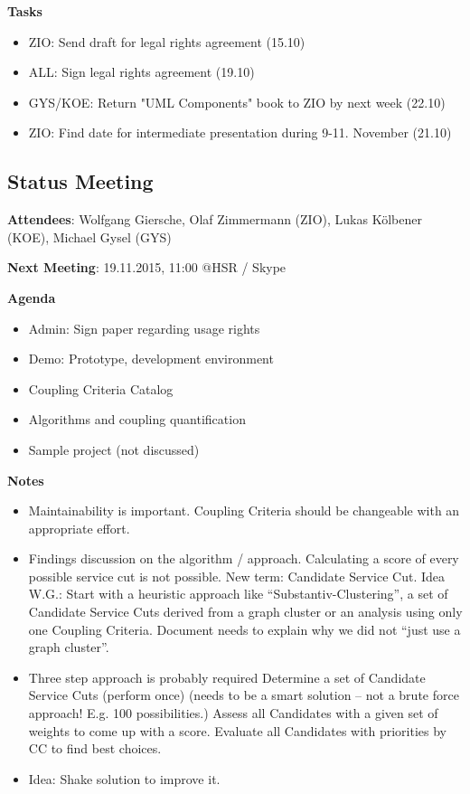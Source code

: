 \textbf{Tasks}
\begin{itemize}
\item ZIO: Send draft for legal rights agreement (15.10)
\item ALL: Sign legal rights agreement (19.10)
\item GYS/KOE: Return "UML Components" book to ZIO by next week (22.10)
\item ZIO: Find date for intermediate presentation during 9-11. November (21.10)
\end{itemize}


\subsection{Status Meeting }
\label{sec:status22102015}

\textbf{Attendees}: Wolfgang Giersche, Olaf Zimmermann (ZIO), Lukas Kölbener (KOE), Michael Gysel (GYS)
 
\textbf{Next Meeting}: 19.11.2015, 11:00 @HSR / Skype

\textbf{Agenda}

\begin{itemize}
\item Admin: Sign paper regarding usage rights
\item Demo: Prototype, development environment
\item Coupling Criteria Catalog
\item Algorithms and coupling quantification
\item Sample project (not discussed)
\end{itemize}
 
\textbf{Notes}

\begin{itemize}
\item Maintainability is important. Coupling Criteria should be changeable with an appropriate effort.
\item Findings discussion on the algorithm / approach.
\subitem Calculating a score of every possible service cut is not possible.
\subitem New term: Candidate Service Cut.
\subitem Idea W.G.: Start with a heuristic approach like “Substantiv-Clustering”, a set of Candidate Service Cuts derived from a graph cluster or an analysis using only one Coupling Criteria.
\subitem Document needs to explain why we did not “just use a graph cluster”.
\item Three step approach is probably required
\subitem Determine a set of Candidate Service Cuts (perform once) (needs to be a smart solution – not a brute force approach! E.g. 100 possibilities.)
\subitem Assess all Candidates with a given set of weights to come up with a score.
\subitem Evaluate all Candidates with priorities by CC to find best choices.
\item Idea: Shake solution to improve it.
\end{itemize}
 
